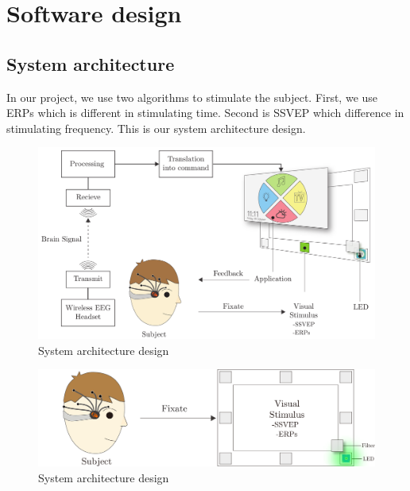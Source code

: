 \chapter{Software design}

\label{ch:Software design}

\setlength{\parindent}{4em}
\setlength{\parskip}{1em}
\renewcommand{\baselinestretch}{1.5}

\section{System architecture}

\hspace{1.5cm}In our project, we use two algorithms to stimulate the subject. First, we use ERPs which is different in stimulating time. Second is SSVEP which difference in stimulating frequency. This is our system architecture design.

\begin{figure}[ht]
	\centering
	\includegraphics[scale = 0.28]{chapter5/architec.pdf}
	\caption{System architecture design}
\end{figure}

\begin{figure}[ht]
	\centering
	\includegraphics[scale = 0.3]{chapter5/frame_led.pdf}
	\caption{System architecture design}
\end{figure}

